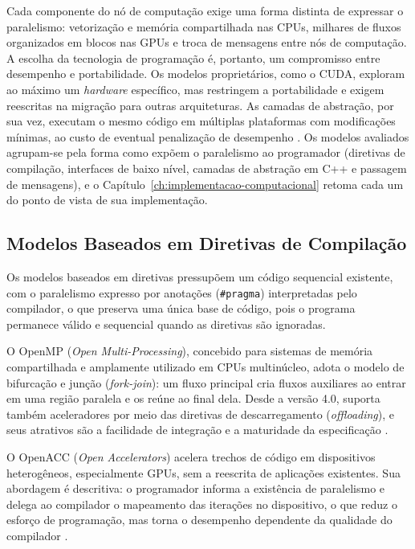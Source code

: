 Cada componente do nó de computação exige uma forma distinta de expressar o paralelismo: vetorização e memória compartilhada nas CPUs, milhares de fluxos organizados em blocos nas GPUs e troca de mensagens entre nós de computação.
A escolha da tecnologia de programação é, portanto, um compromisso entre desempenho e portabilidade.
Os modelos proprietários, como o CUDA, exploram ao máximo um \textit{hardware} específico, mas restringem a portabilidade e exigem reescritas na migração para outras arquiteturas.
As camadas de abstração, por sua vez, executam o mesmo código em múltiplas plataformas com modificações mínimas, ao custo de eventual penalização de desempenho \parencite{Wong2016}.
Os modelos avaliados agrupam-se pela forma como expõem o paralelismo ao programador (diretivas de compilação, interfaces de baixo nível, camadas de abstração em C++ e passagem de mensagens), e o Capítulo~\ref{ch:implementacao-computacional} retoma cada um do ponto de vista de sua implementação.


\subsection{Modelos Baseados em Diretivas de Compilação}\label{subsec:modelos-por-diretivas}

Os modelos baseados em diretivas pressupõem um código sequencial existente, com o paralelismo expresso por anotações (\texttt{\#pragma}) interpretadas pelo compilador, o que preserva uma única base de código, pois o programa permanece válido e sequencial quando as diretivas são ignoradas.

O OpenMP (\textit{Open Multi-Processing}), concebido para sistemas de memória compartilhada e amplamente utilizado em CPUs multinúcleo, adota o modelo de bifurcação e junção (\textit{fork-join}): um fluxo principal cria fluxos auxiliares ao entrar em uma região paralela e os reúne ao final dela.
Desde a versão 4.0, suporta também aceleradores por meio das diretivas de descarregamento (\textit{offloading}), e seus atrativos são a facilidade de integração e a maturidade da especificação \parencite{Dagum1998}.

O OpenACC (\textit{Open Accelerators}) acelera trechos de código em dispositivos heterogêneos, especialmente GPUs, sem a reescrita de aplicações existentes.
Sua abordagem é descritiva: o programador informa a existência de paralelismo e delega ao compilador o mapeamento das iterações no dispositivo, o que reduz o esforço de programação, mas torna o desempenho dependente da qualidade do compilador \parencite{Wolfe2018}.

